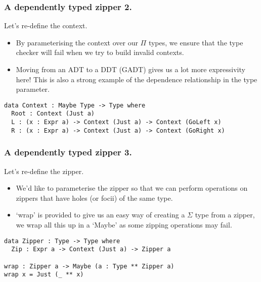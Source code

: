 \documentclass{beamer}
\begin{document}
\begin{frame}[fragile]
  \frametitle{A dependently typed zipper 2.}
  \begin{block}{Let's re-define the context.}
    \begin{itemize}
      \item By parameterising the context over our $\Pi$ types, we
        ensure that the type checker will fail when we try to build
        invalid contexts.
      \item Moving from an ADT to a DDT (GADT) gives us a lot more
        expressivity here! This is also a strong example of the
        dependence relationship in the type parameter.
    \end{itemize}
    \begin{verbatim}
data Context : Maybe Type -> Type where
  Root : Context (Just a)
  L : (x : Expr a) -> Context (Just a) -> Context (GoLeft x)
  R : (x : Expr a) -> Context (Just a) -> Context (GoRight x)
    \end{verbatim}
  \end{block}
\end{frame}

\begin{frame}[fragile]
  \frametitle{A dependently typed zipper 3.}
  \begin{block}{Let's re-define the zipper.}
    \begin{itemize}
      \item We'd like to parameterise the zipper so that we can
        perform operations on zippers that have holes (or focii) of
        the same type.
      \item `wrap' is provided to give us an easy way of creating a
        $\Sigma$ type from a zipper, we wrap all this up in a `Maybe'
        as some zipping operations may fail.
    \end{itemize}
  \begin{verbatim}
data Zipper : Type -> Type where
  Zip : Expr a -> Context (Just a) -> Zipper a

wrap : Zipper a -> Maybe (a : Type ** Zipper a)
wrap x = Just (_ ** x)
  \end{verbatim}
  \end{block}
\end{frame}
\end{document}
